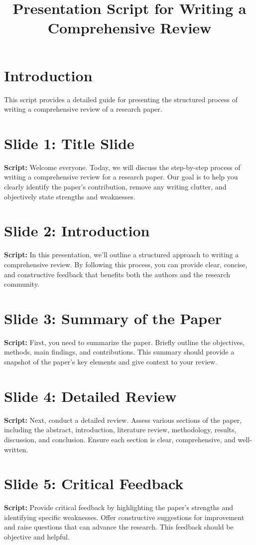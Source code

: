\documentclass[12pt]{article}
\title{Presentation Script for Writing a Comprehensive Review}
\author{}
\date{}
\begin{document}
\maketitle

\section*{Introduction}
This script provides a detailed guide for presenting the structured process of writing a comprehensive review of a research paper.

\section{Slide 1: Title Slide}
\textbf{Script:}
Welcome everyone. Today, we will discuss the step-by-step process of writing a comprehensive review for a research paper. Our goal is to help you clearly identify the paper's contribution, remove any writing clutter, and objectively state strengths and weaknesses.

\section{Slide 2: Introduction}
\textbf{Script:}
In this presentation, we'll outline a structured approach to writing a comprehensive review. By following this process, you can provide clear, concise, and constructive feedback that benefits both the authors and the research community.

\section{Slide 3: Summary of the Paper}
\textbf{Script:}
First, you need to summarize the paper. Briefly outline the objectives, methods, main findings, and contributions. This summary should provide a snapshot of the paper's key elements and give context to your review.

\section{Slide 4: Detailed Review}
\textbf{Script:}
Next, conduct a detailed review. Assess various sections of the paper, including the abstract, introduction, literature review, methodology, results, discussion, and conclusion. Ensure each section is clear, comprehensive, and well-written.

\section{Slide 5: Critical Feedback}
\textbf{Script:}
Provide critical feedback by highlighting the paper's strengths and identifying specific weaknesses. Offer constructive suggestions for improvement and raise questions that can advance the research. This feedback should be objective and helpful.
\end{document}
